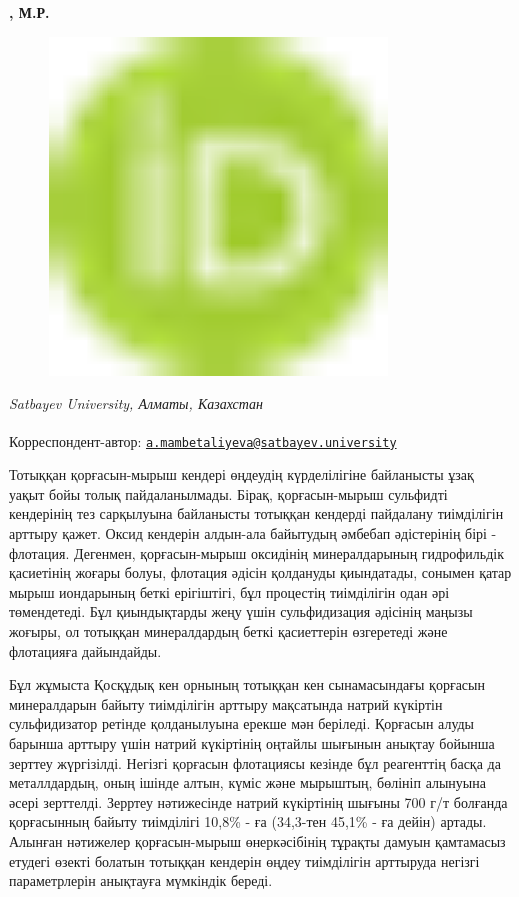 {\bfseries , М.Р.
\begin{figure}[H]
	\centering
	\includegraphics[width=0.8\textwidth]{media/gorn/image1}
	\caption*{}
\end{figure}


\emph{Satbayev University, Алматы, Казахстан}

{\bfseries \textsuperscript{\envelope }}Корреспондент-автор:
\href{mailto:a.mambetaliyeva@satbayev.university}{\nolinkurl{a.mambetaliyeva@satbayev.university}}

Тотыққан қорғасын-мырыш кендері өңдеудің күрделілігіне байланысты ұзақ
уақыт бойы толық пайдаланылмады. Бірақ, қорғасын-мырыш сульфидті
кендерінің тез сарқылуына байланысты тотыққан кендерді пайдалану
тиімділігін арттыру қажет. Оксид кендерін алдын-ала байытудың әмбебап
әдістерінің бірі - флотация. Дегенмен, қорғасын-мырыш оксидінің
минералдарының гидрофильдік қасиетінің жоғары болуы, флотация әдісін
қолдануды қиындатады, сонымен қатар мырыш иондарының беткі ерігіштігі,
бұл процестің тиімділігін одан әрі төмендетеді. Бұл қиындықтарды жеңу
үшін сульфидизация әдісінің маңызы жоғыры, ол тотыққан минералдардың
беткі қасиеттерін өзгеретеді және флотацияға дайындайды.

Бұл жұмыста Қосқұдық кен орнының тотыққан кен сынамасындағы қорғасын
минералдарын байыту тиімділігін арттыру мақсатында натрий күкіртін
сульфидизатор ретінде қолданылуына ерекше мән беріледі. Қорғасын алуды
барынша арттыру үшін натрий күкіртінің оңтайлы шығынын анықтау бойынша
зерттеу жүргізілді. Негізгі қорғасын флотациясы кезінде бұл реагенттің
басқа да металлдардың, оның ішінде алтын, күміс және мырыштың, бөлініп
алынуына әсері зерттелді. Зерртеу нәтижесінде натрий күкіртінің шығыны
700 г/т болғанда қорғасынның байыту тиімділігі 10,8\% - ға (34,3-тен
45,1\% - ға дейін) артады. Алынған нәтижелер қорғасын-мырыш
өнеркәсібінің тұрақты дамуын қамтамасыз етудегі өзекті болатын тотыққан
кендерін өңдеу тиімділігін арттыруда негізгі параметрлерін анықтауға
мүмкіндік береді.

}
